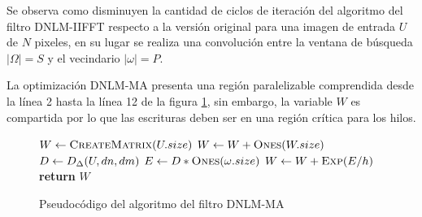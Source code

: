 Se observa como disminuyen la cantidad de ciclos de iteración del algoritmo del filtro DNLM-IIFFT respecto a la versión original para una imagen de entrada $U$ de $N$ pixeles, en su lugar se realiza una convolución entre la ventana de búsqueda $|\Omega|=S$ y el vecindario $|\omega|=P$. 

La optimización DNLM-MA presenta una región paralelizable comprendida desde la línea 2 hasta la línea 12 de la figura \ref{fig:euclid3}, sin embargo, la variable $W$ es compartida por lo que las escrituras deben ser en una región crítica para los hilos. 


\begin{figure}[H]

\begin{algorithmic}[1]
\State $W\gets \Call{CreateMatrix}{U.size}$
			\State $W\gets W + \Call{Ones}{W.size}$
		\Else
			\State $D\gets \Call{$D_{\Delta}$}{U,dn,dm}$  
			\State $E\gets D * \Call{Ones}{\omega.size}$ 
			\State $W\gets W + \Call{Exp}{E/h}$ 
		\EndIf
	\EndFor
\EndFor
\State \textbf{return} $W$
\end{algorithmic}
\caption{Pseudocódigo del algoritmo del filtro DNLM-MA}\label{fig:euclid3}
\end{figure}


 

